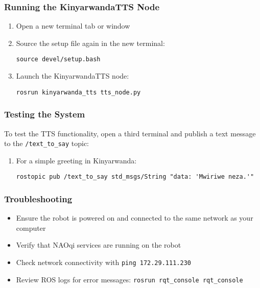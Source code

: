 \documentclass{CSSRforAfrica}
\begin{document}
\subsubsection{Running the KinyarwandaTTS Node}
\begin{enumerate}
    \item Open a new terminal tab or window
    
    \item Source the setup file again in the new terminal:
    \begin{lstlisting}[style=commandstyle]
    source devel/setup.bash
    \end{lstlisting}
    
    \item Launch the KinyarwandaTTS node:
    \begin{lstlisting}[style=commandstyle]
    rosrun kinyarwanda_tts tts_node.py
    \end{lstlisting}
\end{enumerate}

\subsubsection{Testing the System}
To test the TTS functionality, open a third terminal and publish a text message to the \texttt{/text\_to\_say} topic:

\begin{enumerate}
    \item For a simple greeting in Kinyarwanda:
    \begin{lstlisting}[style=commandstyle]
    rostopic pub /text_to_say std_msgs/String "data: 'Mwiriwe neza.'"
    \end{lstlisting}
    
\end{enumerate}

\subsubsection{Troubleshooting}
\begin{itemize}
    \item Ensure the robot is powered on and connected to the same network as your computer
    \item Verify that NAOqi services are running on the robot
    \item Check network connectivity with \texttt{ping 172.29.111.230}
    \item Review ROS logs for error messages: \texttt{rosrun rqt\_console rqt\_console}
\end{itemize}
\end{document}
